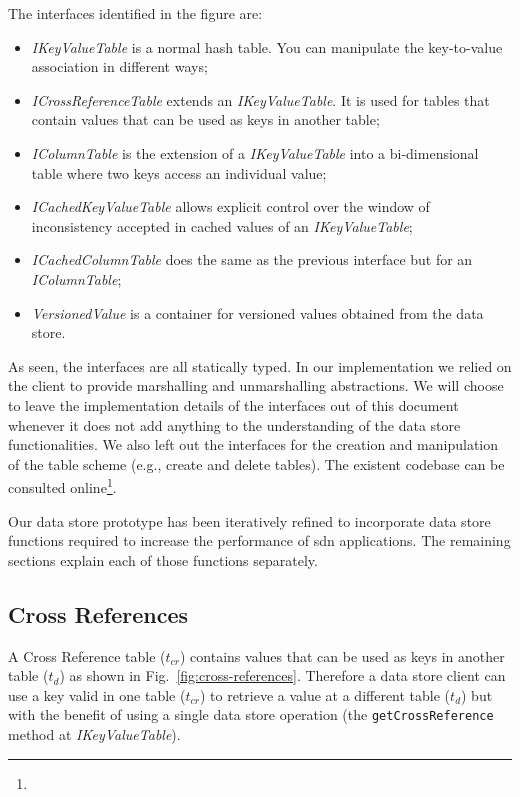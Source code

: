 The interfaces identified in the figure are: 
\begin{itemize}
\item \emph{IKeyValueTable}  is a normal hash table. You can manipulate the key-to-value association in different ways;
\item \emph{ICrossReferenceTable} extends an \emph{IKeyValueTable}. It is used for tables that contain values that can be used as keys in another table;
\item \emph{IColumnTable} is the extension of a \emph{IKeyValueTable} into a bi-dimensional table where two keys access an individual value;
\item \emph{ICachedKeyValueTable} allows explicit control over the window of inconsistency accepted in cached values of an \emph{IKeyValueTable};
\item \emph{ICachedColumnTable} does the same as the previous interface but for an \emph{IColumnTable}; 
\item \emph{VersionedValue} is a container for versioned values obtained from the data store. 
\end{itemize}

As seen, the interfaces are all statically typed. In our implementation we relied on the client to provide marshalling and unmarshalling abstractions. We will choose to leave the implementation details of the interfaces out of this document whenever it does not add anything to the understanding of the data store functionalities. We also left out the interfaces for the creation and manipulation of the table scheme (e.g., create and delete tables). The existent codebase can be consulted online\footnote{}. 

\label{sec:heimdall:key-value}
Our data store prototype has been iteratively refined to incorporate data store functions required to increase the performance of \gls{sdn} applications. The remaining sections explain each of those functions separately. 


\subsection{Cross References} 
\label{sec:heimdall:cross-references}


A Cross Reference table ($t_{cr}$) contains values that can be used as keys in another table ($t_{d}$) as shown in Fig.~\ref{fig:cross-references}. 
Therefore a data store client can use a key valid in  one table ($t_{cr}$) to retrieve a value at  a different table ($t_{d}$) but with the benefit of using a  single data store operation (the \texttt{getCrossReference} method at \emph{IKeyValueTable}). 

